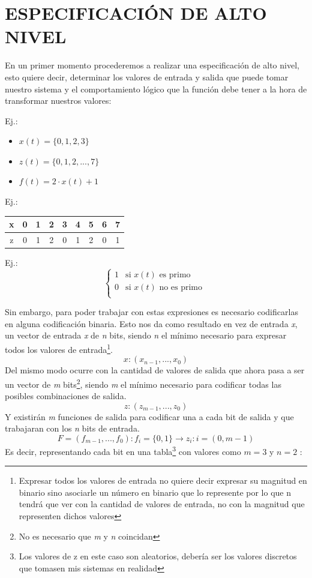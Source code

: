 \documentclass[a4paper,10pt]{book}
\begin{document}
\section*{ESPECIFICACIÓN DE ALTO NIVEL}
En un primer momento procederemos a realizar una especificación de alto nivel, esto quiere decir, determinar los valores de entrada y salida que puede tomar nuestro sistema y el comportamiento lógico que la función debe tener a la hora de transformar nuestros valores:\par
Ej.:
\begin{itemize}
\item $x(t)=\{0,1,2,3\}$
\item $z(t)=\{0,1,2,...,7\}$
\item $f(t)=2\cdot x(t)+1$
\end{itemize}

Ej.:
\begin{center}
\begin{tabular}{|c|c|c|c|c|c|c|c|c|}
\hline
 x & 0 & 1 & 2 & 3 & 4 & 5 & 6 & 7 \\
 \hline
 z & 0 & 1 & 2 & 0 & 1 & 2 & 0 & 1 \\
 \hline  
\end{tabular}\par
\end{center}

Ej.:
\begin{equation*}
\begin{cases}
1 & \mbox{si } x(t)\mbox{ es primo} \\
0 & \mbox{si } x(t)\mbox{ no es primo }\\
\end{cases}
\end{equation*}

Sin embargo, para poder trabajar con estas expresiones es necesario codificarlas en alguna codificación binaria. Esto nos da como resultado en vez de entrada \textit{x}, un vector de entrada \textit{x} de \textit{n} bits, siendo \textit{n} el mínimo necesario para expresar todos los valores de entrada\footnote{Expresar todos los valores de entrada no quiere decir expresar su magnitud en binario sino asociarle un número en binario que lo represente por lo que n tendrá que ver con la cantidad de valores de entrada, no con la magnitud que representen dichos valores}.
$$x: (x_{n-1}, ..., x_0)$$
Del mismo modo ocurre con la cantidad de valores de salida que ahora pasa a ser un vector de \textit{m} bits\footnote{No es necesario que \textit{m} y \textit{n} coincidan}, siendo \textit{m} el mínimo necesario para codificar todas las posibles combinaciones de salida.
$$z: (z_{m-1}, ..., z_0)$$
Y existirán \textit{m} funciones de salida para codificar una a cada bit de salida y que trabajaran con los \textit{n} bits de entrada.
$$F=(f_{m-1},..., f_0): f_i=\{0,1\}\rightarrow z_i : i=(0,m-1)$$
Es decir, representando cada bit en una tabla\footnote{Los valores de z en este caso son aleatorios, debería ser los valores discretos que tomasen mis sistemas en realidad} con valores como $m=3$ y $n=2$ :
\end{document}
